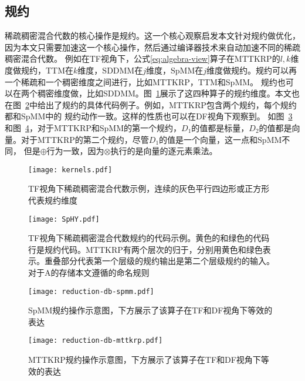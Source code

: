 \subsection{规约}
稀疏稠密混合代数的核心操作是规约。这一个核心观察启发本文针对规约做优化，因为本文只需要加速这一个核心操作，然后通过编译器技术来自动加速不同的稀疏稠密混合代数。
例如在TF视角下，公式\eqref{eq:algebra-view}算子在MTTKRP的$l,k$维度做规约，TTM在$k$维度，SDDMM在$j$维度，SpMM在$j$维度做规约。规约可以再一个稀疏和一个稠密维度之间进行，比如MTTKRP，TTM和SpMM。
规约也可以在两个稠密维度做，比如SDDMM。图~\ref{fig:kernels}展示了这四种算子的规约维度。本文也在图~\ref{fig:four-code}中给出了规约的具体代码例子。例如，MTTKRP包含两个规约，每个规约都和SpMM中的
规约动作一致。这样的性质也可以在DF视角下观察到。 如图~\ref{fig:redb-spmm}和图~\ref{fig:redb-mttkrp}，对于MTTKRP和SpMM的第一个规约，$D_1$的值都是标量，$D_2$的值都是向量。对于MTTKRP的第二个规约，尽管$D_1$的值是一个向量，这一点和SpMM不同，
但是$\oplus$行为一致，因为$\otimes$执行的是向量的逐元素乘法。
\begin{figure}[h]%
  \centering
  \texttt{[image: kernels.pdf]}
  \caption{TF视角下稀疏稠密混合代数示例，连续的灰色平行四边形或正方形代表规约维度}
  \label{fig:kernels}
\end{figure}
\begin{figure}[h]%
  \centering
  \texttt{[image: SpHY.pdf]}
  \caption{TF视角下稀疏稠密混合代数规约的代码示例。黄色的和绿色的代码行是规约代码。MTTKRP有两个层次的归于，分别用黄色和绿色表示。重叠部分代表第一个层级的规约输出是第二个层级规约的输入。对于A的存储本文遵循\cite{kjolstad:2020:phd-thesis}的命名规则}
  \label{fig:four-code}
\end{figure}
\begin{figure}[h]%
  \centering
  \texttt{[image: reduction-db-spmm.pdf]}
  \caption{SpMM规约操作示意图，下方展示了该算子在TF和DF视角下等效的表达}
  \label{fig:redb-spmm}
\end{figure}
\begin{figure}[h]%
  \centering
  \texttt{[image: reduction-db-mttkrp.pdf]}
  \caption{MTTKRP规约操作示意图，下方展示了该算子在TF和DF视角下等效的表达}
  \label{fig:redb-mttkrp}
\end{figure}

